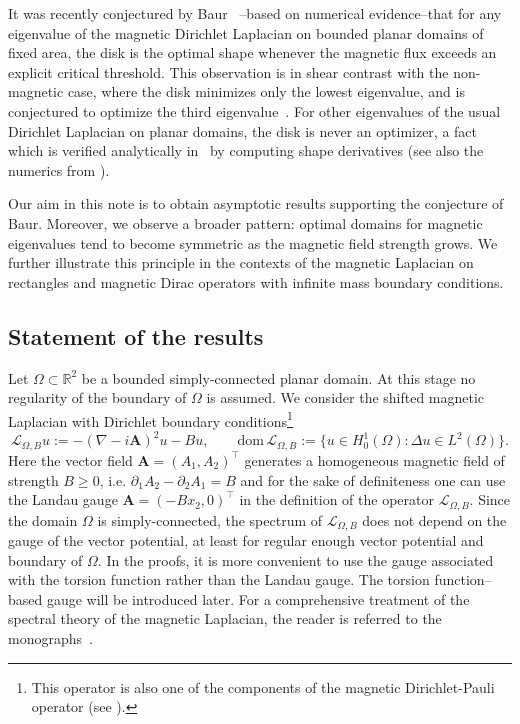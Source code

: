 \documentclass[11pt,a4paper]{amsart}
\newcommand\Omg{\Omega}
\numberwithin{figure}{section}
\numberwithin{equation}{section}
\theoremstyle{plain}%
\theoremstyle{remark}
\theoremstyle{plain}
\newcommand{\dom}{\mathrm{dom}\,}
\newcommand{\R}{\mathbb R}
\begin{document}
It was recently conjectured by Baur ~\cite{baur}--based on numerical evidence--that for any eigenvalue
of the magnetic Dirichlet Laplacian on bounded planar domains of fixed area, the disk is the optimal shape whenever the magnetic flux exceeds an explicit critical threshold. This observation is in shear contrast with the non-magnetic case, where the disk minimizes only the lowest eigenvalue, and is conjectured to optimize the third eigenvalue~\cite[Open problem 8]{H}. For other eigenvalues of the usual Dirichlet Laplacian on planar domains, the disk is never an optimizer, a fact which is verified analytically in~\cite{B15} by computing shape derivatives (see also the numerics from \cite{O04,AF12}).

Our aim in this note is to obtain asymptotic results supporting the conjecture of Baur. Moreover, we observe a broader pattern: optimal domains for magnetic eigenvalues tend to become symmetric as the magnetic field strength grows. We further illustrate this principle in the contexts of the magnetic Laplacian on rectangles and magnetic Dirac operators with infinite mass boundary conditions.

\subsection{Statement of the results}
Let $\Omega \subset \R^2$ be a bounded simply-connected planar domain. At this stage no regularity of the boundary of $\Omg$ is assumed. We consider the shifted magnetic Laplacian with Dirichlet boundary conditions\footnote{This operator is also one of the components of the magnetic Dirichlet-Pauli operator (see \cite{MagneticPauli}).}
\[ \mathscr{L}_{\Omega,B}u := -(\nabla -i \mathbf A)^2u -Bu,
\qquad \dom\mathscr{L}_{\Omega,B} := \big\{u\in H^1_0(\Omg)\colon\Delta u \in L^2(\Omg)\big\}.
\]
Here the vector field $\mathbf A = (A_1,A_2)^\top$ generates a homogeneous magnetic field of strength $B\geq 0$, i.e. $\partial_1 A_2 - \partial_2 A_1 = B$
and for the sake of definiteness one can use the Landau gauge $\mathbf A = (-Bx_2,0)^\top$ in the definition of the operator $\mathscr{L}_{\Omega,B}$. Since the domain $\Omg$ is simply-connected, the spectrum of $\mathscr{L}_{\Omega,B}$ does not depend on the gauge of the vector potential, at least for regular enough vector potential and  boundary of $\Omg$. In the proofs, it is more convenient to use the gauge associated with the torsion function rather than the Landau gauge. The torsion function–based gauge will be introduced later. For a comprehensive treatment of the spectral theory of the magnetic Laplacian, the reader is referred to the monographs~\cite{FH-b, R17}.
\end{document}

